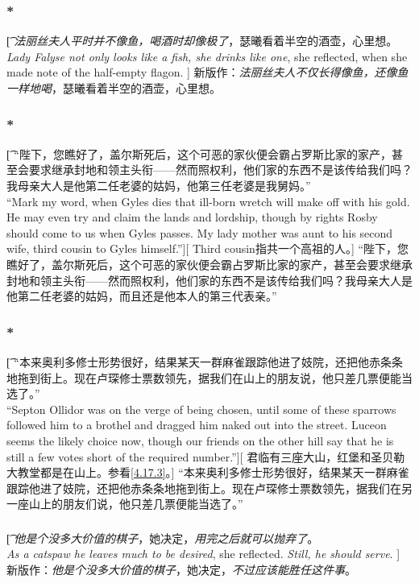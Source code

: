 \documentclass[12pt,a4paper]{article}
\begin{document}
\subsubsection{\color{red}*}\t[
	\emph{法丽丝夫人平时并不像鱼，喝酒时却像极了}，瑟曦看着半空的酒壶，心里想。\\
	\emph{Lady Falyse not only looks like a fish, she drinks like one}, she reflected, when she made note of the half-empty flagon. ]
	新版作：\emph{法丽丝夫人不仅长得像鱼，还像鱼一样地喝}，瑟曦看着半空的酒壶，心里想。
	
\subsubsection{\color{red}*}\t[
	“陛下，您瞧好了，盖尔斯死后，这个可恶的家伙便会霸占罗斯比家的家产，甚至会要求继承封地和领主头衔——然而照权利，他们家的东西不是该传给我们吗？我母亲大人是他第二任老婆的姑妈，他第三任老婆是我舅妈。”\\
	“Mark my word, when Gyles dies that ill-born wretch will make off with his gold. He may even try and claim the lands and lordship, though by rights Rosby should come to us when Gyles passes. My lady mother was aunt to his second wife, third cousin to Gyles himself.”][
	Third cousin指共一个高祖的人。]
	“陛下，您瞧好了，盖尔斯死后，这个可恶的家伙便会霸占罗斯比家的家产，甚至会要求继承封地和领主头衔——然而照权利，他们家的东西不是该传给我们吗？我母亲大人是他第二任老婆的姑妈，而且还是他本人的第三代表亲。”
	
\subsubsection{\color{red}*}\label{4.24.8}\t[
	 “本来奥利多修士形势很好，结果某天一群麻雀跟踪他进了妓院，还把他赤条条地拖到街上。现在卢琛修士票数领先，据我们在山上的朋友说，他只差几票便能当选了。” \\
	 “Septon Ollidor was on the verge of being chosen, until some of these sparrows followed him to a brothel and dragged him naked out into the street. Luceon seems the likely choice now, though our friends on the other hill say that he is still a few votes short of the required number.”][
	 君临有三座大山，红堡和圣贝勒大教堂都是在山上。参看\ref{4.17.3}。]
	 “本来奥利多修士形势很好，结果某天一群麻雀跟踪他进了妓院，还把他赤条条地拖到街上。现在卢琛修士票数领先，据我们在另一座山上的朋友们说，他只差几票便能当选了。” 

\subsubsection{}\t[
	\emph{他是个没多大价值的棋子}，她决定，\emph{用完之后就可以抛弃了}。\\
	\emph{As a catspaw he leaves much to be desired}, she reflected. \emph{Still, he should serve}. ]
	新版作：\emph{他是个没多大价值的棋子}，她决定，\emph{不过应该能胜任这件事}。
	
\end{document}
